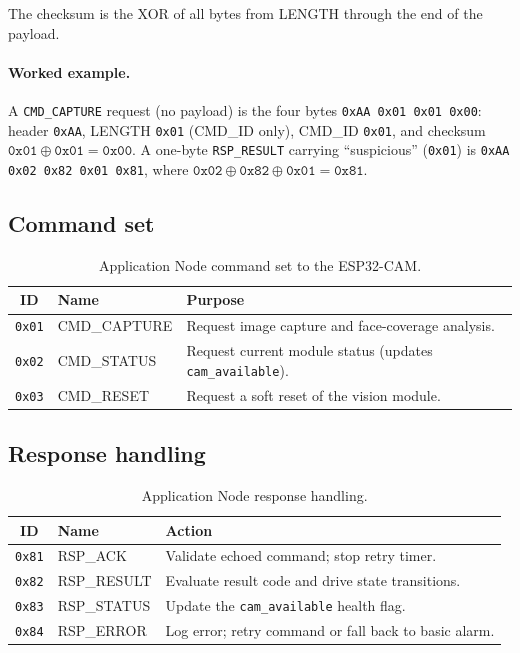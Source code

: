 \documentclass[11pt,a4paper]{article}
\begin{document}
The checksum is the XOR of all bytes from LENGTH through the end of the payload.

\paragraph{Worked example.}  A \texttt{CMD\_CAPTURE} request (no payload) is the
four bytes \texttt{0xAA 0x01 0x01 0x00}: header \texttt{0xAA}, LENGTH
\texttt{0x01} (CMD\_ID only), CMD\_ID \texttt{0x01}, and checksum
$\texttt{0x01}\oplus\texttt{0x01}=\texttt{0x00}$.  A one-byte \texttt{RSP\_RESULT}
carrying ``suspicious'' (\texttt{0x01}) is \texttt{0xAA 0x02 0x82 0x01 0x81},
where $\texttt{0x02}\oplus\texttt{0x82}\oplus\texttt{0x01}=\texttt{0x81}$.

\subsection{Command set}

\begin{table}[H]
    \centering
    \caption{Application Node command set to the ESP32-CAM.}
    \begin{tabular}{@{}c l >{\raggedright\arraybackslash}p{6.5cm}@{}}
        \toprule
        \textbf{ID} & \textbf{Name} & \textbf{Purpose} \\
        \midrule
        \texttt{0x01} & CMD\_CAPTURE & Request image capture and face-coverage analysis. \\
        \texttt{0x02} & CMD\_STATUS  & Request current module status (updates \texttt{cam\_available}). \\
        \texttt{0x03} & CMD\_RESET   & Request a soft reset of the vision module. \\
        \bottomrule
    \end{tabular}
\end{table}

\subsection{Response handling}

\begin{table}[H]
    \centering
    \caption{Application Node response handling.}
    \begin{tabular}{@{}c l >{\raggedright\arraybackslash}p{6cm}@{}}
        \toprule
        \textbf{ID} & \textbf{Name} & \textbf{Action} \\
        \midrule
        \texttt{0x81} & RSP\_ACK     & Validate echoed command; stop retry timer. \\
        \texttt{0x82} & RSP\_RESULT   & Evaluate result code and drive state transitions. \\
        \texttt{0x83} & RSP\_STATUS   & Update the \texttt{cam\_available} health flag. \\
        \texttt{0x84} & RSP\_ERROR    & Log error; retry command or fall back to basic alarm. \\
        \bottomrule
    \end{tabular}
\end{table}
\end{document}
